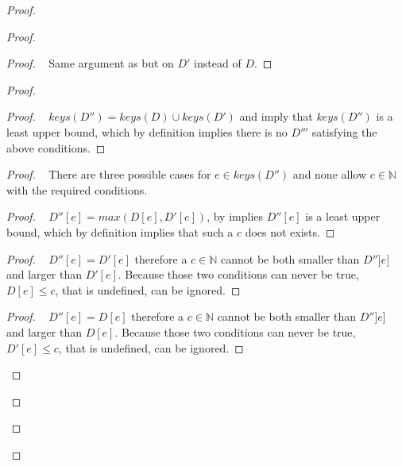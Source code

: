 \documentclass[10pt, oneside]{article}   	%
\begin{document}
\begin{proof}
\begin{proof}
		\begin{proof}
			\pf~ Same argument as  but on $D'$ instead of $D$.
		\end{proof}
		
		\begin{proof}
			\begin{proof}
				\pf~ $\textit{keys}(D'') = \textit{keys}(D) \cup \textit{keys}(D')$ and  imply that $\textit{keys}(D'')$ is a least upper bound, which by definition implies there is no $D'''$ satisfying the above conditions.
			\end{proof}
			
			\begin{proof}
				\pfsketch~ There are three possible cases for $e \in \textit{keys}(D'')$ and none allow $c \in \mathds{N}$ with the required conditions.
				\begin{proof}
					\pf~ $D''[e] = \textit{max}(D[e], D'[e])$, by  implies $D''[e]$ is a least upper bound, which by definition implies that such a $c$ does not exists.
				\end{proof}
				
				\begin{proof}
					\pf~ $D''[e] = D'[e]$ therefore a $c \in \mathds{N}$ cannot be both smaller than $D'']e]$ and larger than $D'[e]$. Because those two conditions can never be true, $D[e] \leq c$, that is undefined, can be ignored.
				\end{proof}
				
				\begin{proof}
					\pf~ $D''[e] = D[e]$ therefore a $c \in \mathds{N}$ cannot be both smaller than $D'']e]$ and larger than $D[e]$. Because those two conditions can never be true,  $D'[e] \leq c$, that is undefined, can be ignored.


\end{proof}
\end{proof}
\end{proof}
\end{proof}
\end{proof}
\end{document}
